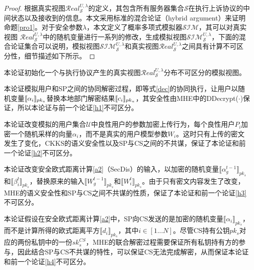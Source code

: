 \begin{proof}
	根据真实视图$\mathcal{R} e a l_{\mathcal{S}}^{U, \lambda}$的定义，其包含所有服务器集合$\mathcal{S}$在执行上诉协议的中间状态以及接收到的信息。本文采用标准的混合论证（hybrid argument）\cite{bonawitz2017practical, xu2020privacy}来证明命题\ref{pro1}。对于安全参数$ \lambda $，本文定义了概率多项式模拟器$\mathcal{SIM}$，其可以对真实视图 $\mathcal{R} e a l_{\mathcal{S}}^{U, \lambda}$中的随机变量进行一系列的修改，生成模拟视图$ \mathcal{S I} \mathcal{M}_{\mathcal{S}}^{U, \lambda} $，下面的混合论证集合可以说明，模拟视图$ \mathcal{S I} \mathcal{M}_{\mathcal{S}}^{U, \lambda} $和真实视图$\mathcal{R} e a l_{\mathcal{S}}^{U, \lambda}$之间具有计算不可区分性，细节描述如下所示。
\end{proof}

\begin{hybrid}\label{h1}
	本论证初始化一个与执行协议产生的真实视图$\mathcal{R} e a l_{\mathcal{S}}^{U, \lambda}$分布不可区分的模拟视图。
\end{hybrid}

\begin{hybrid}\label{h2}
	本论证模拟用户和SP之间的协同解密过程，即等式\ref{dec}的协同执行，让用户以随机变量$\ctx[pk_u]{\alpha_i}$替换本地部门解密结果$\ctx[pk_u]{c_i}$，其安全性由MHE中的DDecrypt($\cdot$)保证，所以本论证与前一个论证\ref{h1}不可区分。
\end{hybrid}

\begin{hybrid}\label{h3}
	本论证改变模拟的用户集合$\mathcal{U}$中良性用户的参数加密上传行为，每个良性用户$P_i$加密一个随机采样的向量$\alpha_i$，而不是真实的用户模型参数$W_i$。这时只有上传的密文发生了变化，CKKS的语义安全性以及SP与CS之间的不共谋，保证了本论证和前一个论证\ref{h2}不可区分。
\end{hybrid}

\begin{hybrid}\label{h4}
	本论证改变安全欧式距离计算\ref{a2}（SecDis）的输入，以加密的随机变量$\llbracket \alpha_{g}^{t-1}\rrbracket_{pk_s}$和$\llbracket \beta_i^{t}\rrbracket_{pk_s}$，替换原来的输入$\llbracket W_{g}^{t-1}\rrbracket_{pk_s}$和$\llbracket W_i^{t}\rrbracket_{pk_s}$。由于只有密文内容发生了改变，MHE的语义安全性和SP与CS之间不共谋的性质，保证了本论证和前一个论证\ref{h3}不可区分。
\end{hybrid}

\begin{hybrid}\label{h5}
	本论证假设在安全欧式距离计算\ref{a2}中，SP向CS发送的是加密的随机变量$\llbracket \alpha_i\rrbracket_{pk_s}$，而不是计算所得的欧式距离平方$\llbracket d_i \rrbracket_{pk_s}$，其中$i \in [1...N]$。尽管CS持有公钥$pk_s$对应的两份私钥中的一份$sk_s^{CS}$，MHE的联合解密过程需要保证所有私钥持有方的参与，因此结合SP与CS不共谋的特性，可以保证CS无法完成解密，从而保证本论证和前一个论证\ref{h4}不可区分。
\end{hybrid}


